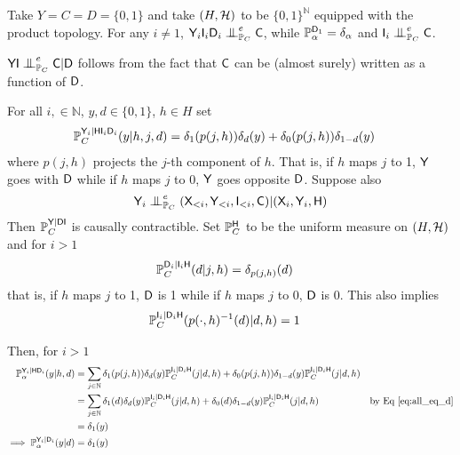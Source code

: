 \begin{example}
Take $Y=C=D=\{0,1\}$ and take $(H,\mathcal{H})$ to be $\{0,1\}^{\mathbb{N}}$ equipped with the product topology. For any $i\neq 1$, $\RV{Y}_i\RV{I}_i\RV{D}_i\CI^e_{\prob{P}_C} \RV{C}$, while $\mathbb{P}_\alpha^{\mathsf{D}_1}=\delta_\alpha$ and $\RV{I}_i\CI^e_{\prob{P}_C} \RV{C}$.

$\RV{YI}\CI^e_{\prob{P}_C} \RV{C}|\RV{D}$ follows from the fact that $\mathsf{C}$ can be (almost surely) written as a function of $\mathsf{D}$.

For all $i,\in \mathbb{N}$, $y,d\in \{0,1\}$, $h\in H$ set
\begin{align}
    \mathbb{P}_C^{\mathsf{Y}_i|\mathsf{H}\mathsf{I}_i\mathsf{D}_i}(y|h,j,d) &= \delta_1(p(j,h))\delta_d(y) + \delta_0(p(j,h))\delta_{1-d}(y)
\end{align}
where $p(j,h)$ projects the $j$-th component of $h$. That is, if $h$ maps $j$ to 1, $\mathsf{Y}$ goes with $\mathsf{D}$ while if $h$ maps $j$ to $0$, $\mathsf{Y}$ goes opposite $\mathsf{D}$. Suppose also 
\begin{align}
    \RV{Y}_i\CI_{\prob{P}_C}^e (\RV{X}_{<i},\RV{Y}_{<i},\RV{I}_{<i},\RV{C})|(\RV{X}_i,\RV{Y}_i,\RV{H})
\end{align}
Then $\mathbb{P}_C^{\mathsf{Y}|\mathsf{DI}}$ is causally contractible. Set $\mathbb{P}_{C}^{\mathsf{H}}$ to be the uniform measure on $(H,\mathcal{H})$ and for $i>1$
\begin{align}
    \mathbb{P}_C^{\mathsf{D}_i|\mathsf{I}_i\mathsf{H}}(d|j,h) &= \delta_{p(j,h)}(d)
\end{align}
that is, if $h$ maps $j$ to 1, $\mathsf{D}$ is 1 while if $h$ maps $j$ to $0$, $\mathsf{D}$ is 0. This also implies
\begin{align}
    \mathbb{P}_C^{\mathsf{I}_i|\mathsf{D}_i\mathsf{H}}(p(\cdot,h)^{-1}(d)|d,h) &= 1\label{eq:all_eq_d}
\end{align}

Then, for $i>1$
\begin{align}
    \mathbb{P}_\alpha^{\mathsf{Y}_i|\mathsf{H}\mathsf{D}_i}(y|h,d) &= \sum_{j\in \mathbb{N}} \delta_1(p(j,h))\delta_d(y)\mathbb{P}_C^{\mathsf{I}_i|\mathsf{D}_i\mathsf{H}}(j|d,h) + \delta_0(p(j,h))\delta_{1-d}(y)\mathbb{P}_C^{\mathsf{I}_i|\mathsf{D}_i\mathsf{H}}(j|d,h)\\
    &= \sum_{j\in \mathbb{N}} \delta_1(d)\delta_d(y)\mathbb{P}_C^{\mathsf{I}_i|\mathsf{D}_i\mathsf{H}}(j|d,h) + \delta_0(d)\delta_{1-d}(y)\mathbb{P}_C^{\mathsf{I}_i|\mathsf{D}_i\mathsf{H}}(j|d,h)&\text{by Eq \ref{eq:all_eq_d}}\\
    &= \delta_1(y)\\
    \implies \mathbb{P}_\alpha^{\mathsf{Y}_i|\mathsf{D}_i}(y|d) &= \delta_1(y)
\end{align}


\end{example}
